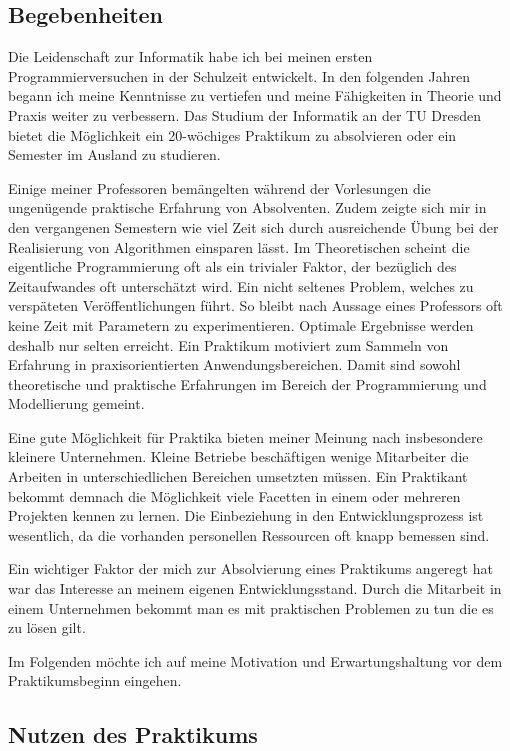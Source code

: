 \documentclass[12pt]{article}
\begin{document}
\subsection{Begebenheiten}

Die Leidenschaft zur Informatik habe ich bei meinen ersten Programmierversuchen in der Schulzeit entwickelt.
In den folgenden Jahren begann ich meine Kenntnisse zu vertiefen und meine Fähigkeiten in Theorie
und Praxis weiter zu verbessern. Das Studium der Informatik an der TU Dresden bietet die Möglichkeit
ein 20-wöchiges Praktikum zu absolvieren oder ein Semester im Ausland zu studieren.

Einige meiner Professoren bemängelten während der Vorlesungen die ungenügende praktische Erfahrung von
Absolventen. Zudem zeigte sich mir in den vergangenen Semestern wie viel Zeit sich durch ausreichende Übung
bei der Realisierung von Algorithmen einsparen lässt. Im Theoretischen scheint die eigentliche Programmierung
oft als ein trivialer Faktor, der bezüglich des Zeitaufwandes oft unterschätzt wird. 
Ein nicht seltenes Problem, welches zu verspäteten Veröffentlichungen führt.
So bleibt nach Aussage eines Professors oft keine Zeit mit Parametern zu experimentieren.
Optimale Ergebnisse werden deshalb nur selten erreicht.
Ein Praktikum motiviert zum Sammeln von Erfahrung in praxisorientierten Anwendungsbereichen. Damit sind sowohl
theoretische und praktische Erfahrungen im Bereich der Programmierung und Modellierung gemeint.

Eine gute Möglichkeit für Praktika bieten meiner Meinung nach insbesondere kleinere Unternehmen. 
Kleine Betriebe beschäftigen wenige Mitarbeiter die Arbeiten in unterschiedlichen Bereichen umsetzten müssen.
Ein Praktikant bekommt demnach die Möglichkeit viele Facetten in einem oder mehreren Projekten kennen zu lernen.
Die Einbeziehung in den Entwicklungsprozess ist wesentlich, da die vorhanden personellen Ressourcen oft knapp
bemessen sind.
 
Ein wichtiger Faktor der mich zur Absolvierung eines Praktikums angeregt hat war das Interesse an meinem
eigenen Entwicklungsstand. Durch die Mitarbeit in einem Unternehmen bekommt man es mit praktischen Problemen
zu tun die es zu lösen gilt.

Im Folgenden möchte ich auf meine Motivation und Erwartungshaltung vor dem Praktikumsbeginn eingehen.

\subsection{Nutzen des Praktikums}
\end{document}
